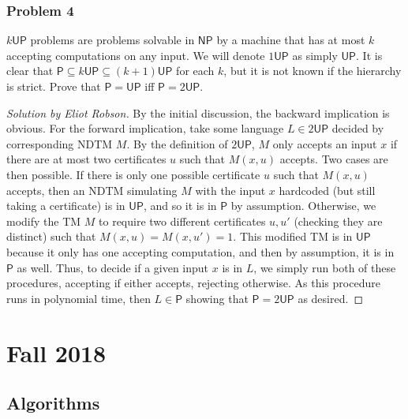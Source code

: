 \documentclass{article}
\newenvironment{solution}[1]{\begin{proof}[Solution by #1]}{\end{proof}}
\newcommand{\NP}{\mathsf{NP}}
\newcommand{\Pe}{\mathsf{P}}
\newcommand{\UP}{\mathsf{UP}}
\begin{document}
\subsubsection{Problem 4}
\(k \UP\) problems are problems solvable in \(\NP\) by a machine that has at most \(k\) accepting computations on any input. We will denote \(1 \UP\) as simply \(\UP\). It is clear that \(\Pe \subseteq k \UP \subseteq (k + 1) \UP\) for each \(k\), but it is not known if the hierarchy is strict. Prove that \(\Pe = \UP\) iff \(\Pe = 2 \UP\).

\begin{solution}{Eliot Robson}
    By the initial discussion, the backward implication is obvious. For the forward implication, take some language \(L \in 2 \UP\) decided by corresponding NDTM \(M\). By the definition of \(2 \UP\), \(M\) only accepts an input \(x\) if there are at most two certificates \(u\) such that \(M(x,u)\) accepts. Two cases are then possible. If there is only one possible certificate \(u\) such that \(M(x,u)\) accepts, then an NDTM simulating \(M\) with the input \(x\) hardcoded (but still taking a certificate) is in \(\UP\), and so it is in \(\Pe\) by assumption. Otherwise, we modify the TM \(M\) to require two different certificates \(u, u'\) (checking they are distinct) such that \(M(x, u) = M(x, u') = 1\). This modified TM is in \(\UP\) because it only has one accepting computation, and then by assumption, it is in \(\Pe\) as well. Thus, to decide if a given input \(x\) is in \(L\), we simply run both of these procedures, accepting if either accepts, rejecting otherwise. As this procedure runs in polynomial time, then \(L \in \Pe\) showing that \(\Pe = 2 \UP\) as desired.
    
\end{solution}


\section{Fall 2018}

\subsection{Algorithms}
\end{document}
